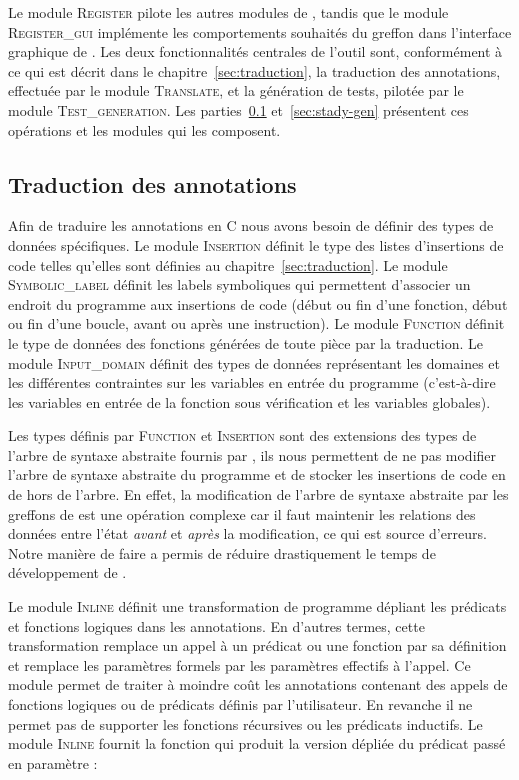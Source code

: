 Le module \textsc{Register} pilote les autres modules de \stady, tandis que le
module \textsc{Register\_gui} implémente les comportements souhaités du greffon
dans l'interface graphique de \framac.
Les deux fonctionnalités centrales de l'outil sont, conformément à ce qui est
décrit dans le chapitre~\ref{sec:traduction}, la traduction des annotations,
effectuée par le module \textsc{Translate}, et la génération de tests, pilotée
par le module \textsc{Test\_generation}.
Les parties~\ref{sec:stady-trad} et~\ref{sec:stady-gen} présentent ces
opérations et les modules qui les composent.


\subsection{Traduction des annotations}
\label{sec:stady-trad}


Afin de traduire les annotations \eacsl en C nous avons besoin de définir des
types de données spécifiques.
Le module \textsc{Insertion} définit le type des listes d'insertions de code
telles qu'elles sont définies au chapitre~\ref{sec:traduction}.
Le module \textsc{Symbolic\_label} définit les labels symboliques qui permettent
d'associer un endroit du programme aux insertions de code (début ou fin d'une
fonction, début ou fin d'une boucle, avant ou après une instruction).
Le module \textsc{Function} définit le type de données des fonctions générées
de toute pièce par la traduction.
Le module \textsc{Input\_domain} définit des types de données représentant les
domaines et les différentes contraintes sur les variables en entrée du
programme (c'est-à-dire les variables en entrée de la fonction sous vérification
et les variables globales).

Les types définis par \textsc{Function} et \textsc{Insertion} sont des
extensions des types de l'arbre de syntaxe abstraite fournis par \framac, ils
nous permettent de ne pas modifier l'arbre de syntaxe abstraite du programme et
de stocker les insertions de code en de hors de l'arbre.
En effet, la modification de l'arbre de syntaxe abstraite par les greffons de
\framac est une opération complexe car il faut maintenir les relations
des données entre l'état {\em avant} et {\em après} la modification, ce qui est
source d'erreurs.
Notre manière de faire a permis de réduire drastiquement le temps de
développement de \stady.

Le module \textsc{Inline} définit une transformation de programme dépliant
les prédicats et fonctions logiques dans les annotations.
En d'autres termes, cette transformation remplace un appel à un prédicat ou une
fonction par sa définition et remplace les paramètres formels par les paramètres
effectifs à l'appel.
Ce module permet de traiter à moindre coût les annotations contenant des appels
de fonctions logiques ou de prédicats définis par l'utilisateur.
En revanche il ne permet pas de supporter les fonctions récursives ou les
prédicats inductifs.
Le module \textsc{Inline} fournit la fonction 
qui produit la version dépliée du prédicat passé en paramètre :

